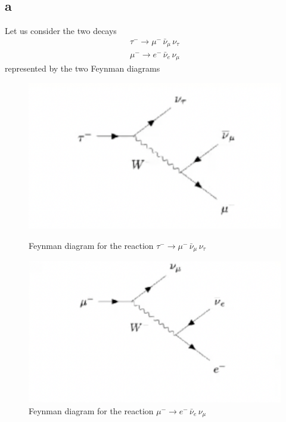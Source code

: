\subsection*{a}
Let us consider the two decays 
\begin{gather*}
    \tau^- \rightarrow \mu^- \, \bar\nu_{\mu} \, \nu_{\tau} \\
    \mu^- \rightarrow e^- \, \bar\nu_e \, \nu_{\mu}
\end{gather*}
represented by the two Feynman diagrams \\
\begin{figure}[hbtp]
    \centering
    \begin{minipage}{0.4\textwidth}
        \includegraphics[scale=0.6]{ex4/tau.png}
        \caption{Feynman diagram for the reaction $\tau^- \rightarrow \mu^- \, \bar\nu_{\mu} \, \nu_{\tau}$}
    \end{minipage}
    \hfill
    \begin{minipage}{0.4\textwidth}
        \includegraphics[scale=0.6]{ex4/mu.png}
        \caption{Feynman diagram for the reaction $\mu^- \rightarrow e^- \, \bar\nu_e \, \nu_{\mu}$}
    \end{minipage}
\end{figure}
